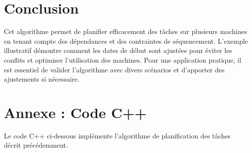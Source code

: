 \documentclass[12pt]{article}
\begin{document}
\section{Conclusion}

Cet algorithme permet de planifier efficacement des tâches sur plusieurs machines en tenant compte des dépendances et des contraintes de séquencement. L'exemple illustratif démontre comment les dates de début sont ajustées pour éviter les conflits et optimiser l'utilisation des machines. Pour une application pratique, il est essentiel de valider l'algorithme avec divers scénarios et d'apporter des ajustements si nécessaire.

\section{Annexe : Code C++}

Le code C++ ci-dessous implémente l'algorithme de planification des tâches décrit précédemment.
\end{document}
